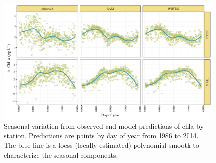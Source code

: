 \documentclass[letterpaper,12pt,oneside]{article}\usepackage[]{graphicx}\usepackage[]{color}
\makeatletter
\def\maxwidth{ %
  \ifdim\Gin@nat@width>\linewidth
    \linewidth
  \else
    \Gin@nat@width
  \fi
}
\newenvironment{knitrout}{}{} %
\makeatother
\begin{document}
\begin{knitrout}
\color{fgcolor}\begin{figure}[!ht]

{\centering \includegraphics[width=\maxwidth]{figs/seas-1} 

}

\caption[Seasonal variation from observed and model predictions of \ac{chla} by station]{Seasonal variation from observed and model predictions of \ac{chla} by station.  Predictions are points by day of year from 1986 to 2014.  The blue line is a loess (locally estimated) polynomial smooth to characterize the seasonal components.}\label{fig:seas}
\end{figure}


\end{knitrout}
\end{document}
